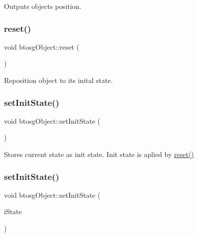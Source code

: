 Outputs object\textquotesingle{}s position. \mbox{\label{classbtosgObject_a93983f9180dd0672f8779cf2baa78580}} 
\subsubsection{\texorpdfstring{reset()}{reset()}}
{\footnotesize\ttfamily void btosg\+Object\+::reset (\begin{DoxyParamCaption}{ }\end{DoxyParamCaption})\hspace{0.3cm}{\ttfamily [inline]}}

Reposition object to its inital state. \mbox{\label{classbtosgObject_ad1508a0ce28cfac83e5f0ff6245f91b5}} 
\subsubsection{\texorpdfstring{set\+Init\+State()}{setInitState()}\hspace{0.1cm}{\footnotesize\ttfamily [1/2]}}
{\footnotesize\ttfamily void btosg\+Object\+::set\+Init\+State (\begin{DoxyParamCaption}{ }\end{DoxyParamCaption})\hspace{0.3cm}{\ttfamily [inline]}}

Stores current state as init state. Init state is aplied by \hyperlink{classbtosgObject_a93983f9180dd0672f8779cf2baa78580}{reset()} \mbox{\label{classbtosgObject_a6ceb08e59ee95acaaef389ee198d2b56}} 
\subsubsection{\texorpdfstring{set\+Init\+State()}{setInitState()}\hspace{0.1cm}{\footnotesize\ttfamily [2/2]}}
{\footnotesize\ttfamily void btosg\+Object\+::set\+Init\+State (\begin{DoxyParamCaption}\item[{bt\+Transform}]{i\+State }\end{DoxyParamCaption})\hspace{0.3cm}{\ttfamily [inline]}}

